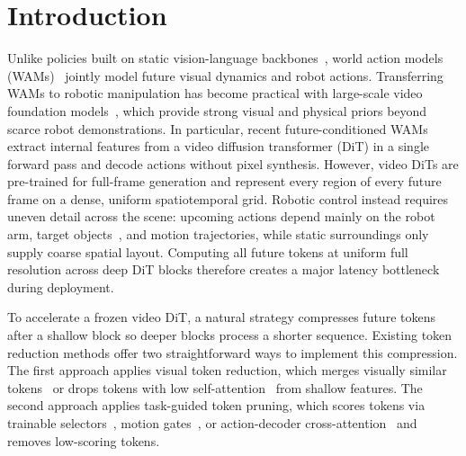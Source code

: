 \vspace{-8pt}\vspace{-8pt}
\section{Introduction}
\label{sec:intro}    
    Unlike policies built on static vision-language backbones~\cite{brohan2023rt2,kim2024openvla,black2025pi0}, world action models (WAMs)~\cite{pai2025mimicvideo,hu2025vpp,ma2026dit4dit,ye2026dreamzero} jointly model future visual dynamics and robot actions.
    Transferring WAMs to robotic manipulation has become practical with large-scale video foundation models~\cite{nvidia2025cosmos,wan2025wan}, which provide strong visual and physical priors beyond scarce robot demonstrations.
    In particular, recent future-conditioned WAMs~\cite{hu2025vpp,pai2025mimicvideo,ma2026dit4dit} extract internal features from a video diffusion transformer (DiT) in a single forward pass and decode actions without pixel synthesis.
    However, video DiTs are pre-trained for full-frame generation and represent every region of every future frame on a dense, uniform spatiotemporal grid.
    Robotic control instead requires uneven detail across the scene: upcoming actions depend mainly on the robot arm, target objects~\cite{bendikas2025oatvla}, and motion trajectories, while static surroundings only supply coarse spatial layout.
    Computing all future tokens at uniform full resolution across deep DiT blocks therefore creates a major latency bottleneck during deployment.
    
    
    To accelerate a frozen video DiT, a natural strategy compresses future tokens after a shallow block so deeper blocks process a shorter sequence.
    Existing token reduction methods offer two straightforward ways to implement this compression.
    The first approach applies visual token reduction, which merges visually similar tokens~\cite{bolya2023tome,li2024vidtome,hyun2025sttm} or drops tokens with low self-attention~\cite{chen2024fastv} from shallow features.
    The second approach applies task-guided token pruning, which scores tokens via trainable selectors~\cite{rao2021dynamicvit,brohan2023rt1,jiang2025lightvla}, motion gates~\cite{pei2026adp}, or action-decoder cross-attention~\cite{liu2025vlapruner,xie2026sparsewam,kim2026cfprune} and removes low-scoring tokens.
    
